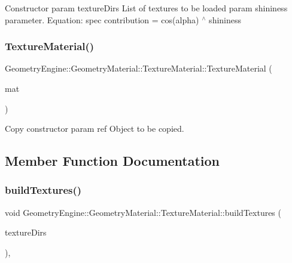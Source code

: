 Constructor param texture\+Dirs List of textures to be loaded param shininess parameter. Equation\+: spec contribution = cos(alpha) $^\wedge$ shininess \mbox{\label{class_geometry_engine_1_1_geometry_material_1_1_texture_material_a60678cd8338eeae2996e72b1d96a2364}} 
\subsubsection{\texorpdfstring{TextureMaterial()}{TextureMaterial()}\hspace{0.1cm}{\footnotesize\ttfamily [3/3]}}
{\footnotesize\ttfamily Geometry\+Engine\+::\+Geometry\+Material\+::\+Texture\+Material\+::\+Texture\+Material (\begin{DoxyParamCaption}\item[{const \mbox{\hyperlink{class_geometry_engine_1_1_geometry_material_1_1_texture_material}{Texture\+Material}} \&}]{mat }\end{DoxyParamCaption})}

Copy constructor param ref Object to be copied. 

\subsection{Member Function Documentation}
\mbox{\label{class_geometry_engine_1_1_geometry_material_1_1_texture_material_a39212e653a556734e261ef610ab0ad9f}} 
\subsubsection{\texorpdfstring{buildTextures()}{buildTextures()}}
{\footnotesize\ttfamily void Geometry\+Engine\+::\+Geometry\+Material\+::\+Texture\+Material\+::build\+Textures (\begin{DoxyParamCaption}\item[{const std\+::list$<$ \mbox{\hyperlink{class_geometry_engine_1_1_geometry_material_1_1_texture_parameters}{Texture\+Parameters}} $\ast$ $>$ \&}]{texture\+Dirs }\end{DoxyParamCaption})\hspace{0.3cm}{\ttfamily [protected]}, {\ttfamily [virtual]}}

